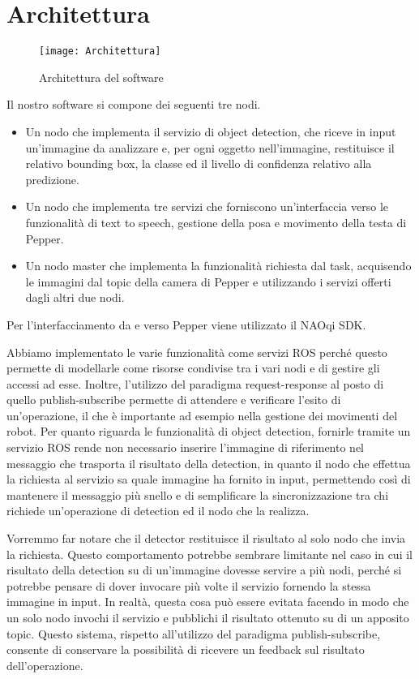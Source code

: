 \section{Architettura}

\begin{figure}[t]
	\centering
	\texttt{[image: Architettura]}
	\caption{Architettura del software}
	\label{fig:architecture}
\end{figure}

Il nostro software si compone dei seguenti tre nodi.
\begin{itemize}
    \item Un nodo che implementa il servizio di object detection, che riceve in input un’immagine da analizzare e, per ogni oggetto nell’immagine, restituisce il relativo bounding box, la classe ed il livello di confidenza relativo alla predizione.
    \item Un nodo che implementa tre servizi che forniscono un’interfaccia verso le funzionalità di text to speech, gestione della posa e movimento della testa di Pepper.
    \item Un nodo master che implementa la funzionalità richiesta dal task, acquisendo le immagini dal topic della camera di Pepper e utilizzando i servizi offerti dagli altri due nodi.
\end{itemize}
Per l’interfacciamento da e verso Pepper viene utilizzato il NAOqi SDK.

Abbiamo implementato le varie funzionalità come servizi ROS perché questo permette di modellarle come risorse condivise tra i vari nodi e di gestire gli accessi ad esse. Inoltre, l'utilizzo del paradigma request-response al posto di quello publish-subscribe permette di attendere e verificare l'esito di un'operazione, il che è importante ad esempio nella gestione dei movimenti del robot.
Per quanto riguarda le funzionalità di object detection, fornirle tramite un servizio ROS rende non necessario inserire l'immagine di riferimento nel messaggio che trasporta il risultato della detection, in quanto il nodo che effettua la richiesta al servizio sa quale immagine ha fornito in input, permettendo così di mantenere il messaggio più snello e di semplificare la sincronizzazione tra chi richiede un'operazione di detection ed il nodo che la realizza.

Vorremmo far notare che il detector restituisce il risultato al solo nodo che invia la richiesta. Questo comportamento potrebbe sembrare limitante nel caso in cui il risultato della detection su di un'immagine dovesse servire a più nodi, perché si potrebbe pensare di dover invocare più volte il servizio fornendo la stessa immagine in input. In realtà, questa cosa può essere evitata facendo in modo che un solo nodo invochi il servizio e pubblichi il risultato ottenuto su di un apposito topic. Questo sistema, rispetto all'utilizzo del paradigma publish-subscribe, consente di conservare la possibilità di ricevere un feedback sul risultato dell'operazione. 

